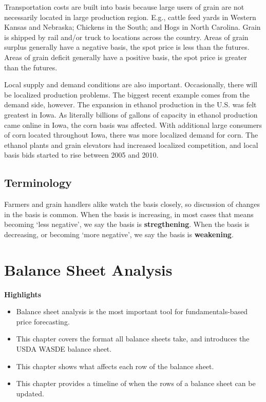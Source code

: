 \documentclass[
]{book}
\providecommand{\tightlist}{%
  \setlength{\itemsep}{0pt}\setlength{\parskip}{0pt}}
\begin{document}
Transportation costs are built into basis because large users of grain are not necessarily located in large production region. E.g., cattle feed yards in Western Kansas and Nebraska; Chickens in the South; and Hogs in North Carolina. Grain is shipped by rail and/or truck to locations across the country. Areas of grain surplus generally have a negative basis, the spot price is less than the futures. Areas of grain deficit generally have a positive basis, the spot price is greater than the futures.

Local supply and demand conditions are also important. Occasionally, there will be localized production problems. The biggest recent example comes from the demand side, however. The expansion in ethanol production in the U.S. was felt greatest in Iowa. As literally billions of gallons of capacity in ethanol production came online in Iowa, the corn basis was affected. With additional large consumers of corn located throughout Iowa, there was more localized demand for corn. The ethanol plants and grain elevators had increased localized competition, and local basis bids started to rise between 2005 and 2010.

\hypertarget{terminology}{%
\section{Terminology}\label{terminology}}

Farmers and grain handlers alike watch the basis closely, so discussion of changes in the basis is common. When the basis is increasing, in most cases that means becoming `less negative', we say the basis is \textbf{stregthening}. When the basis is decreasing, or becoming `more negative', we say the basis is \textbf{weakening}.

\hypertarget{balance-sheet-analysis}{%
\chapter{Balance Sheet Analysis}\label{balance-sheet-analysis}}

\textbf{Highlights}

\begin{itemize}
\tightlist
\item
  Balance sheet analysis is the most important tool for fundamentals-based price forecasting.
\item
  This chapter covers the format all balance sheets take, and introduces the USDA WASDE balance sheet.
\item
  This chapter shows what affects each row of the balance sheet.
\item
  This chapter provides a timeline of when the rows of a balance sheet can be updated.
\end{itemize}
\end{document}
